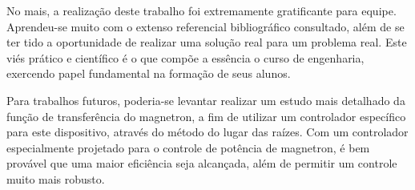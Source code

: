 No mais, a realização deste trabalho foi extremamente gratificante para equipe. Aprendeu-se muito com o extenso referencial bibliográfico consultado, além de se ter tido a oportunidade de realizar uma solução real para um problema real. Este viés prático e científico é o que compõe a essência o curso de engenharia, exercendo papel fundamental na formação de seus alunos.

Para trabalhos futuros, poderia-se levantar realizar um estudo mais detalhado da função de transferência do magnetron, a fim de utilizar um controlador específico para este dispositivo, através do método do lugar das raízes. Com um controlador especialmente projetado para o controle de potência de magnetron, é bem provável que uma maior eficiência seja alcançada, além de permitir um controle muito mais robusto.